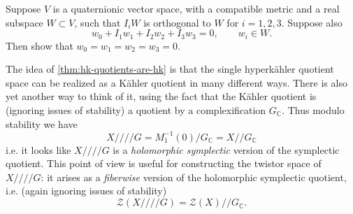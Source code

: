 \documentclass[12pt,letterpaper,reqno]{article}
\numberwithin{equation}{section}
\newcommand{\cZ}{\ensuremath{\mathcal Z}}
\newcommand{\C}{\ensuremath{\mathbb C}}
\newcommand{\kahler}{K\"ahler\xspace}
\newcommand{\kq}{/\!\!/}
\newcommand{\hk}{hyperk\"ahler\xspace}
\newcommand{\hkq}{/\!\!/\!\!/\!\!/}
\newcommand{\ti}[1]{\textit{#1}}
\begin{document}
\begin{exercise} \label{exc:quat-linear-indep}
Suppose $V$ is a quaternionic vector space, with a compatible metric 
and a real subspace $W \subset V$, such that
$I_i W$ is orthogonal to $W$ for $i = 1,2,3$.
Suppose also
\begin{equation}
 w_0 + I_1 w_1 + I_2 w_2 + I_3 w_3 = 0, \qquad w_i \in W.
\end{equation}
Then show that $w_0 = w_1 = w_2 = w_3 = 0$.
\end{exercise}

The idea of \autoref{thm:hk-quotients-are-hk} is 
that the single \hk quotient space can be realized as a \kahler 
quotient in many different ways. There is also yet another way to think of
it, using the fact that the \kahler quotient is (ignoring issues of stability)
a quotient by a complexification $G_\C$. Thus modulo stability we have
\begin{equation}
  X \hkq G = M_1^{-1}(0) / G_\C = X \kq G_\C
\end{equation}
i.e. it looks like $X \hkq G$ is a \ti{holomorphic symplectic} version 
of the symplectic quotient. This point of view is useful for 
constructing the twistor space of $X \hkq G$: it arises
as a \ti{fiberwise} version of the holomorphic symplectic quotient,
i.e. (again ignoring issues of stability)
\begin{equation}
  \cZ(X \hkq G) = \cZ(X) \kq G_\C.
\end{equation}
\end{document}
